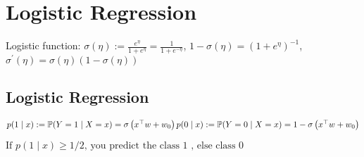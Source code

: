 
\section{Logistic Regression}



Logistic function:
$
\sigma(\eta):=\frac{e^{\eta}}{1+e^{\eta}}=\frac{1}{1+e^{-\eta}}
$, 
$1-\sigma(\eta)=\left(1+e^{\eta}\right)^{-1}$, 
$\sigma^{\prime}(\eta)=\sigma(\eta)(1-\sigma(\eta))$

\subsection*{Logistic Regression}
$
p(1 \mid x):=\mathbb{P}(Y=1 \mid X=x)=\sigma\left(x^{\top} w+w_{0}\right) \\
p(0 \mid x):=\mathbb{P}(Y=0 \mid X=x)=1-\sigma\left(x^{\top} w+w_{0}\right)
$



$
\text {If } p(1 \mid x) \geq 1 / 2 \text {, you predict the class } 1 \text { , else class } 0
$





